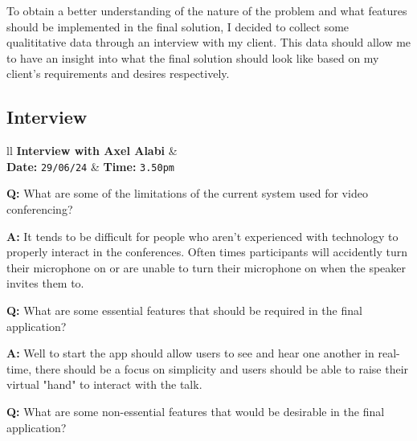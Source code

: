 \vspace{0.2cm}

To obtain a better understanding of the nature of the problem
and what features should be implemented in the final solution,
I decided to collect some qualititative data through an 
interview with my client. This data should allow me to have an
insight into what the final solution should look like based
on my client's requirements and desires respectively.

\subsection{Interview}
\label{sec:interview}

\begin{tcolorbox}[
  boxrule=0pt, frame empty, colback=lightestgray, arc=0pt,
  breakable, colframe=white
]
  \begin{tblr}{ll}
    \textbf{Interview with Axel Alabi} & {}\\
    \textbf{Date: } \texttt{29/06/24} &
    {\hspace{-1.5cm} \textbf{Time: } \texttt{3.50pm}}
  \end{tblr}

  \vspace{0.2cm}

  \textbf{Q:} What are some of the limitations of the current
  system used for video conferencing? \vspace{0.05cm}

  \textbf{A:} It tends to be difficult for people who aren't 
  experienced with technology to properly interact in the 
  conferences. Often times participants will accidently turn 
  their microphone on or are unable to turn their microphone
  on when the speaker invites them to. \vspace{0.25cm}

  \textbf{Q:} What are some essential features that should be
  required in the final application? \vspace{0.05cm}

  \textbf{A:} Well to start the app should allow users to see 
  and hear one another in real-time, there should be a focus on
  simplicity and users should be able to raise their virtual 
  "hand" to interact with the talk. \vspace{0.25cm}

  \textbf{Q:} What are some non-essential features that would
  be desirable in the final application? \vspace{0.05cm}


\end{tcolorbox}
